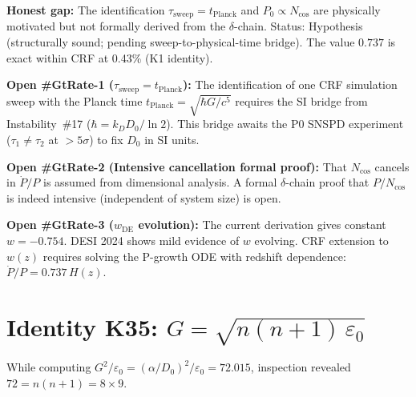 \documentclass[12pt, a4paper]{article}
\begin{document}
\textbf{Honest gap:} The identification $\tau_{\mathrm{sweep}} = t_{\mathrm{Planck}}$
and $P_0\propto N_{\mathrm{cos}}$ are physically motivated but not formally derived from
the $\delta$-chain. Status: Hypothesis (structurally sound; pending sweep-to-physical-time bridge).
The value $0.737$ is exact within CRF at 0.43\% (K1 identity).

\begin{openqbox}[title={Open: Physical-Time Bridge for Cosmic Rate}]
\textbf{Open \#GtRate-1 ($\tau_{\mathrm{sweep}} = t_{\mathrm{Planck}}$):}
The identification of one CRF simulation sweep with the Planck time $t_{\mathrm{Planck}}
= \sqrt{\hbar G/c^5}$ requires the SI bridge from Instability~\#17 ($\hbar = k_D D_0/\ln 2$).
This bridge awaits the P0 SNSPD experiment ($\tau_1\neq\tau_2$ at $>5\sigma$) to fix $D_0$
in SI units.

\textbf{Open \#GtRate-2 (Intensive cancellation formal proof):} That $N_{\mathrm{cos}}$ cancels
in $\dot{P}/P$ is assumed from dimensional analysis. A formal $\delta$-chain proof that
$P/N_{\mathrm{cos}}$ is indeed intensive (independent of system size) is open.

\textbf{Open \#GtRate-3 ($w_{\mathrm{DE}}$ evolution):} The current derivation gives constant
$w = -0.754$. DESI 2024 shows mild evidence of $w$ evolving. CRF extension to $w(z)$ requires
solving the P-growth ODE with redshift dependence: $\dot{P}/P = 0.737\,H(z)$.
\end{openqbox}

\section{Identity K35: $G = \sqrt{n(n+1)\,\varepsilon_0}$}

While computing $G^2/\varepsilon_0 = (\alpha/D_0)^2/\varepsilon_0 = 72.015$,
inspection revealed $72 = n(n+1) = 8\times 9$.
\end{document}
